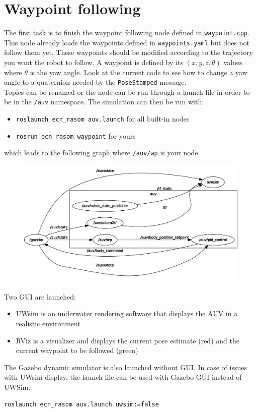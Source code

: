 \documentclass{ecnreport}
\begin{document}
\section{Waypoint following}

The first task is to finish the waypoint following node defined in \texttt{waypoint.cpp}. This node already loads the waypoints defined in \texttt{waypoints.yaml} but does not follow them yet.
These waypoints should be modified according to the trajectory you want the robot to follow. A waypoint is defined by its $(x,y,z,\theta)$ values where $\theta$ is the yaw angle. Look at the current
code to see how to change a yaw angle to a quaternion needed by the \texttt{PoseStamped} message.\\

Topics can be renamed or the node can be run through a launch file in order to be in the \texttt{/auv} namespace.
The simulation can then be run with:
\begin{itemize}
 \item \texttt{roslaunch ecn\_rasom auv.launch} for all built-in nodes
 \item \texttt{rosrun ecn\_rasom waypoint} for yours
\end{itemize}
which leads to the following graph where \texttt{/auv/wp} is your node.
\begin{figure}[h]\centering
 \includegraphics[width=.8\linewidth]{graph_wp}
\end{figure}

Two GUI are launched: 
\begin{itemize}
 \item UWsim is an underwater rendering software that displays the AUV in a realistic environment
 \item RViz is a visualizer and displays the current pose estimate (red) and the current waypoint to be followed (green)
\end{itemize}
The Gazebo dynamic simulator is also launched without GUI. In case of issues with UWsim display, the launch file can be used with Gazebo GUI instead of UWSim:
\begin{center}
\begin{lstlisting}
roslaunch ecn_rasom auv.launch uwsim:=false
  \end{lstlisting}
  \end{center}
\end{document}
